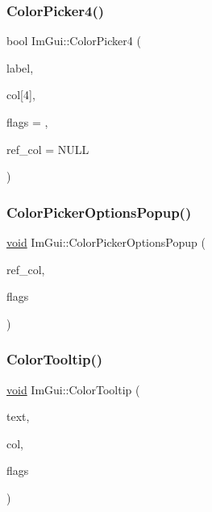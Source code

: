 \mbox{\label{namespaceImGui_a3d5aae9e0a14aa051d5a799abbe97b32}} 
\subsubsection{\texorpdfstring{Color\+Picker4()}{ColorPicker4()}}
{\footnotesize\ttfamily bool Im\+Gui\+::\+Color\+Picker4 (\begin{DoxyParamCaption}\item[{const char $\ast$}]{label,  }\item[{float}]{col\mbox{[}4\mbox{]},  }\item[{Im\+Gui\+Color\+Edit\+Flags}]{flags = {},  }\item[{const float $\ast$}]{ref\+\_\+col = {\ttfamily NULL} }\end{DoxyParamCaption})}

\mbox{\label{namespaceImGui_a6d112eeb6d8ffdebbc9d9a8c66babbee}} 
\subsubsection{\texorpdfstring{Color\+Picker\+Options\+Popup()}{ColorPickerOptionsPopup()}}
{\footnotesize\ttfamily \hyperlink{imgui__impl__opengl3__loader_8h_ac668e7cffd9e2e9cfee428b9b2f34fa7}{void} Im\+Gui\+::\+Color\+Picker\+Options\+Popup (\begin{DoxyParamCaption}\item[{const float $\ast$}]{ref\+\_\+col,  }\item[{Im\+Gui\+Color\+Edit\+Flags}]{flags }\end{DoxyParamCaption})}

\mbox{\label{namespaceImGui_afad90b366b6471e3b13175c0ebeb26c8}} 
\subsubsection{\texorpdfstring{Color\+Tooltip()}{ColorTooltip()}}
{\footnotesize\ttfamily \hyperlink{imgui__impl__opengl3__loader_8h_ac668e7cffd9e2e9cfee428b9b2f34fa7}{void} Im\+Gui\+::\+Color\+Tooltip (\begin{DoxyParamCaption}\item[{const char $\ast$}]{text,  }\item[{const float $\ast$}]{col,  }\item[{Im\+Gui\+Color\+Edit\+Flags}]{flags }\end{DoxyParamCaption})}

